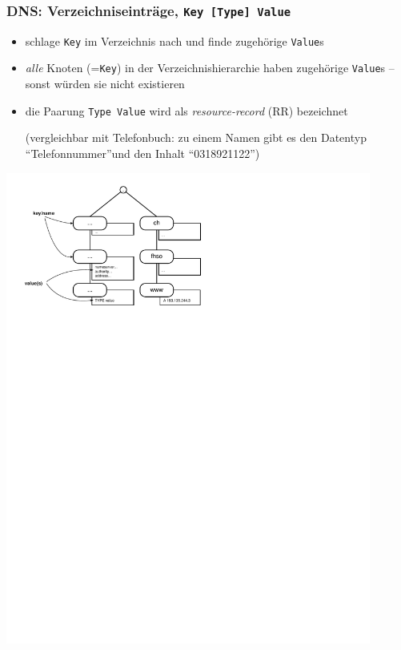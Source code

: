 \documentclass[ignorenonframetext]{beamer}
\begin{document}
\begin{frame}
\frametitle{DNS: Verzeichniseintr\"age, \texttt{Key [Type] Value}}
\begin{itemize}
	\item{schlage \texttt{Key} im Verzeichnis nach und finde zugeh\"orige \texttt{Value}s}
	\item{{\em alle} Knoten (=\texttt{Key}) in der Verzeichnishierarchie haben zugeh\"orige \texttt{Value}s -- sonst w\"urden sie nicht existieren}
	\item{die Paarung \texttt{Type Value} wird als {\em resource-record} (RR) bezeichnet \begin{tiny}(vergleichbar mit Telefonbuch: zu einem Namen gibt es den Datentyp ``Telefonnummer''und den Inhalt ``0318921122'')\end{tiny}}
\end{itemize}
\begin{center}
\includegraphics[width=12cm]{dns-keyvalue}
\end{center}
\end{frame}
\end{document}
